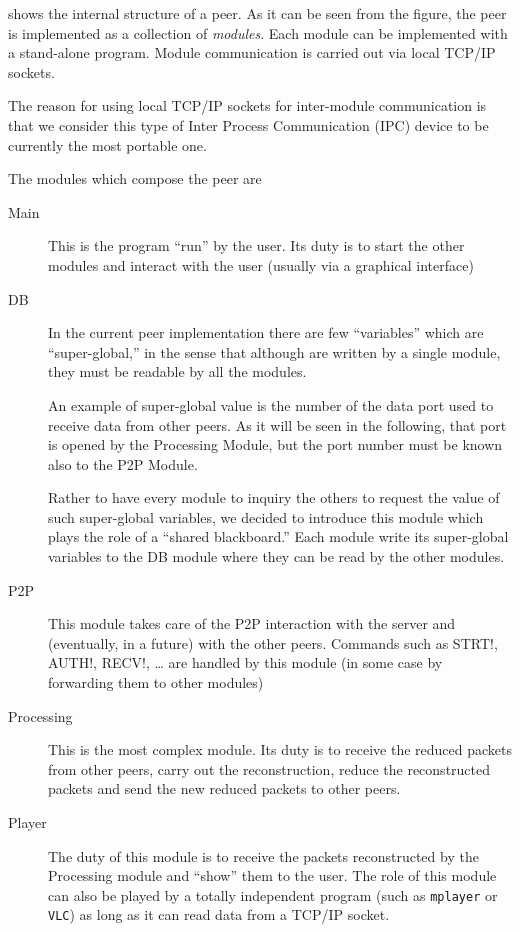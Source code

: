 \documentclass{medusabook}
\begin{document}
 shows the internal structure of a peer.  As it
can be seen from the figure, the peer is implemented as a collection
of \emph{modules}.  Each module can be implemented with a stand-alone
program. Module communication is carried out via local TCP/IP sockets.

\begin{commento}
The reason for using local TCP/IP sockets for inter-module
communication is that we consider this type of Inter Process
Communication (IPC) device to be currently the most portable one.
\end{commento}
%
The modules which compose the peer are

\begin{description}
  \item[Main] This is the program ``run'' by the user.  Its duty is to
  start the other modules and interact with the user (usually via a
  graphical interface)
  \item[DB] 
  In the current peer implementation there are few ``variables'' which
  are ``super-global,'' in the sense that although are written by a
  single module, they must be readable by all the modules.   
  
  \begin{commento}
      An example of super-global value is the number of the data port
      used to receive data from other peers.  As it will be seen in
      the following, that port is opened by the Processing Module, but
      the port number must be known also to the P2P Module.
  \end{commento}

  Rather to have every module to inquiry the others to request the
  value of such super-global variables, we decided to introduce this
  module which plays the role of a ``shared blackboard.''  Each module
  write its super-global variables to the DB module where they can be
  read by the other modules.
  \item[P2P] This module takes care of the P2P interaction with the
  server and (eventually, in a future) with the other peers.  Commands
  such as \ttt STRT!, \ttt AUTH!, \ttt RECV!, 
  \ldots{} are handled by this module (in some case by forwarding them
  to other modules)
  \item[Processing] This is the most complex module.  Its duty is to
  receive the reduced packets from other peers, carry out the
  reconstruction, reduce the reconstructed packets and send the new
  reduced packets to other peers.
  \item[Player] The duty of this module is to receive the packets
  reconstructed by the Processing module and ``show'' them to the
  user.  The role of this module can also be played by a totally
  independent program (such as \texttt{mplayer} or \texttt{VLC}) as
  long as it can read data from a TCP/IP socket.
\end{description}
\end{document}
